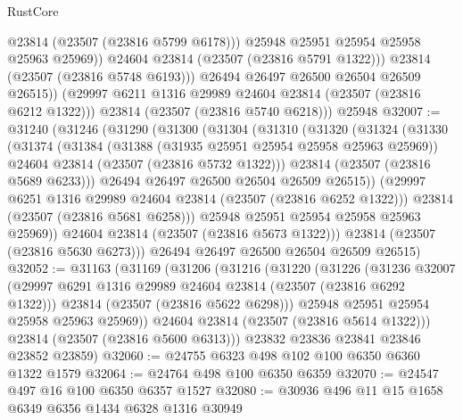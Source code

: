 \begin{lexlean}{RustCore}
\begin{coremodule}
                    @23814
                    (@23507 (@23816 @5799 @6178)))
                  @25948
                  @25951
                  @25954
                  @25958
                  @25963
                  @25969))
              @24604
              @23814
              (@23507 (@23816 @5791 @1322)))
            @23814
            (@23507 (@23816 @5748 @6193)))
          @26494
          @26497
          @26500
          @26504
          @26509
          @26515))
      (@29997 @6211 @1316 @29989 @24604 @23814 (@23507 (@23816 @6212 @1322)))
      @23814
      (@23507 (@23816 @5740 @6218)))
    @25948
@32007 := @31240
    (@31246
      (@31290
        (@31300
          (@31304
            (@31310
              (@31320
                (@31324
                  (@31330
                    (@31374
                      (@31384
                        (@31388 (@31935 @25951 @25954 @25958 @25963 @25969))
                        @24604
                        @23814
                        (@23507 (@23816 @5732 @1322)))
                      @23814
                      (@23507 (@23816 @5689 @6233)))
                    @26494
                    @26497
                    @26500
                    @26504
                    @26509
                    @26515))
                (@29997 @6251 @1316 @29989 @24604 @23814 (@23507 (@23816 @6252 @1322)))
                @23814
                (@23507 (@23816 @5681 @6258)))
              @25948
              @25951
              @25954
              @25958
              @25963
              @25969))
          @24604
          @23814
          (@23507 (@23816 @5673 @1322)))
        @23814
        (@23507 (@23816 @5630 @6273)))
      @26494
      @26497
      @26500
      @26504
      @26509
      @26515)
@32052 := @31163
    (@31169
      (@31206
        (@31216
          (@31220
            (@31226
              (@31236
                @32007
                (@29997 @6291 @1316 @29989 @24604 @23814 (@23507 (@23816 @6292 @1322)))
                @23814
                (@23507 (@23816 @5622 @6298)))
              @25948
              @25951
              @25954
              @25958
              @25963
              @25969))
          @24604
          @23814
          (@23507 (@23816 @5614 @1322)))
        @23814
        (@23507 (@23816 @5600 @6313)))
      @23832
      @23836
      @23841
      @23846
      @23852
      @23859)
@32060 := @24755 @6323 @498 @102 @100 @6350 @6360 @1322 @1579
@32064 := @24764 @498 @100 @6350 @6359
@32070 := @24547 @497 @16 @100 @6350 @6357 @1527
@32080 := @30936 @496 @11 @15 @1658 @6349 @6356 @1434 @6328 @1316 @30949

\end{coremodule}
\end{lexlean}
